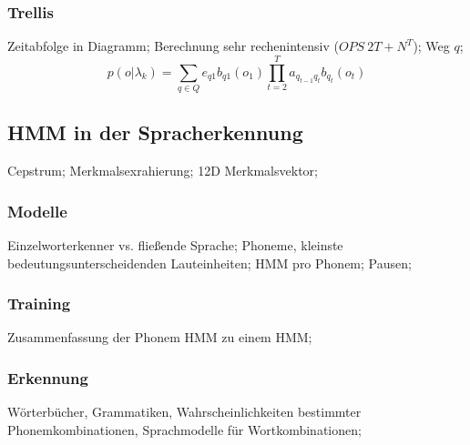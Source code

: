 \documentclass[german,color,6pt]{latex4ei/latex4ei_sheet}
\begin{document}
\begin{sectionbox}
\subsubsection{Trellis}
Zeitabfolge in Diagramm; Berechnung sehr rechenintensiv ($OPS ~ 2T + N^T$); Weg $q$; 
\begin{equation*}
p(o | \lambda_k) = \sum\limits_{q \in Q} e_{q1} b_{q1} (o_1) \prod\limits^T _{t=2} a_{q_{t-1} q_t} b_{q_t} (o_t)
\end{equation*}
\end{sectionbox}

\subsection{HMM in der Spracherkennung}

\begin{symbolbox}
Cepstrum;  Merkmalsexrahierung; 12D Merkmalsvektor;
\end{symbolbox}

\begin{sectionbox}
\subsubsection{Modelle}
Einzelworterkenner vs. fließende Sprache; Phoneme, kleinste bedeutungsunterscheidenden Lauteinheiten; HMM pro Phonem; Pausen; 
\end{sectionbox}

\begin{sectionbox}
\subsubsection{Training}
Zusammenfassung der Phonem HMM zu einem HMM; 
\end{sectionbox}

\begin{sectionbox}
\subsubsection{Erkennung}
Wörterbücher, Grammatiken, Wahrscheinlichkeiten bestimmter Phonemkombinationen, Sprachmodelle für Wortkombinationen; 
\end{sectionbox}
\end{document}
